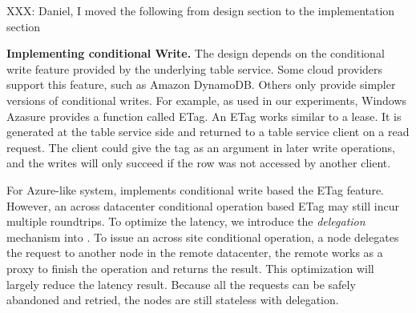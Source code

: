 {XXX: Daniel, I moved the following from design section to the implementation section}

{\bf Implementing conditional Write.}
The \name design depends on the conditional write feature provided by the
underlying table service. Some cloud providers support this feature, such as Amazon DynamoDB.
Others only provide simpler versions of conditional writes. For example, as used in our
experiments, Windows Azasure provides a function called ETag. An ETag works similar to
a lease. It is generated at the table service side and returned to a table service client
on a read request. The client could give the tag as an argument in later write operations,
and the writes will only succeed if the row was not accessed by another client.

For Azure-like system, {\name} implements conditional write based the ETag feature.
However, an across datacenter conditional operation based ETag may still incur multiple
roundtrips. To optimize the latency, we introduce the \emph{delegation} mechanism
into {\name}. To issue an across site conditional operation, a {\name} node delegates the
request to another {\name} node in the remote datacenter, the remote {\name} works as
a proxy to finish the operation and returns the result. This optimization will largely
reduce the latency result. Because all the requests can be safely abandoned and retried,
the {\name} nodes are still stateless with delegation.

